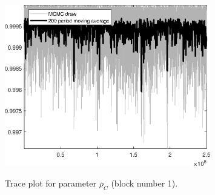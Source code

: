 \begin{figure}[H]
\centering
  \includegraphics[width=0.8\textwidth]{BRS_imp_mobility_alt/graphs/TracePlot_rho_C_blck_1}\\
    \caption{Trace plot for parameter ${\rho_C}$ (block number 1).}
\end{figure}
